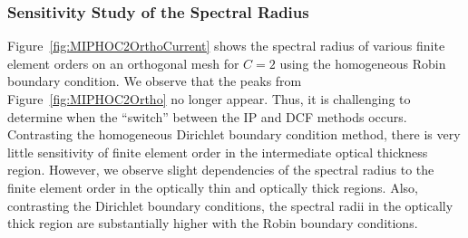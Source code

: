 \documentclass[12pt]{article}
\begin{document}
\begin{comment}
\subsubsection{Fourier Analysis}
\label{sec:RobinBCFourierAnalysis}
In this section, we perform a Fourier analysis of the DSA + SI scheme using Robin boundary conditions. We begin by subtracting Equation~\ref{eq:DSASITransport} from the analytic Equations~\ref{eq:RadTransport}~and~\ref{eq:ScalarFluxIntegral},
\begin{flalign}
\vec{\Omega} \vd \grad \hat{\psi}_m^{(\ell+1/2)} + \sigma_t \hat{\psi}_m^{(\ell+1/2)} & = \frac{1}{4 \pi} \sigma_s \hat{\phi}^{(\ell)},
\end{flalign}

\noindent where $\hat{\psi}_m^{(\ell+1/2)} = \psi _m- \psi_m^{(\ell+1/2)}$ and $\hat{\phi}^{(\ell)} = \phi - \phi^{(\ell)}$ are the deviations of the approximate solution from the exact solution.
\end{comment}

\subsubsection{Sensitivity Study of the Spectral Radius}
\label{sec:SensStudySpecRadRobin}
Figure~\ref{fig:MIPHOC2OrthoCurrent} shows the spectral radius of various finite element orders on an orthogonal mesh for $C=2$ using the homogeneous Robin boundary condition. We observe that the peaks from Figure~\ref{fig:MIPHOC2Ortho} no longer appear. Thus, it is challenging to determine when the ``switch'' between the IP and DCF methods occurs. Contrasting the homogeneous Dirichlet boundary condition method, there is very little sensitivity of finite element order in the intermediate optical thickness region. However, we observe slight dependencies of the spectral radius to the finite element order in the optically thin and optically thick regions. Also, contrasting the Dirichlet boundary conditions, the spectral radii in the optically thick region are substantially higher with the Robin boundary conditions. 
\end{document}

